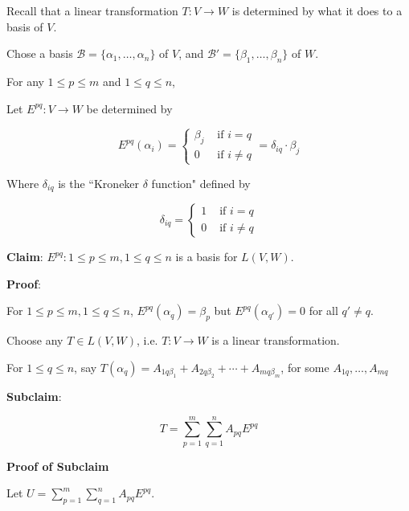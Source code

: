 \documentclass[12pt]{article}
\def\B{\mathcal B}
\begin{document}
  {
    Recall that a linear transformation $T: V \to W$ is determined by what it
    does to a basis of $V$.

    Chose a basis $\B = \{\alpha_1, \dots, \alpha_n \}$ of $V$, and $\B' =
    \{\beta_1, \dots, \beta_n \}$ of $W$.

    For any $1 \le p \le m$ and $1 \le q \le n$,

    Let $E^{pq}: V \to W$ be determined by

    \[
      E^{pq}(\alpha_i) = \begin{cases}
        \beta_j & \text{ if } i = q \\
        0       & \text{ if } i \ne q
      \end{cases}
      = \delta_{iq} \cdot \beta_j
    \]

    Where $\delta_{iq}$ is the ``Kroneker $\delta$ function" defined by

    \[
      \delta_{iq} = \begin{cases}
        1 & \text{ if } i = q \\
        0 & \text{ if } i \ne q
      \end{cases}
    \]

    {\bf Claim}: $E^{pq}: 1 \le p \le m, 1 \le q \le n$ is a basis for $L(V,
    W)$.

    {\bf Proof}: 

    For $1 \le p \le m, 1 \le q \le n$, $E^{pq}(\alpha_q) = \beta_p$ but
    $E^{pq}(\alpha_{q'}) = 0$ for all $q' \ne q$.

    Choose any $T \in L(V, W)$, i.e. $T: V \to W$ is a linear transformation.

    For $1 \le q \le n$, say $T(\alpha_q) = A_{1q \beta_1} + A_{2q \beta_2} +
    \cdots + A_{mq \beta_m}$, for some $A_{1q}, \dots, A_{mq}$


    {\bf Subclaim}:

    \[
      T = \sum_{p = 1}^m \sum_{q = 1}^n A_{pq} E^{pq}
    \]


    {\bf Proof of Subclaim}

    Let $U = \sum_{p = 1}^m \sum_{q = 1}^n A_{pq} E^{pq}$. 
    
}
\end{document}

